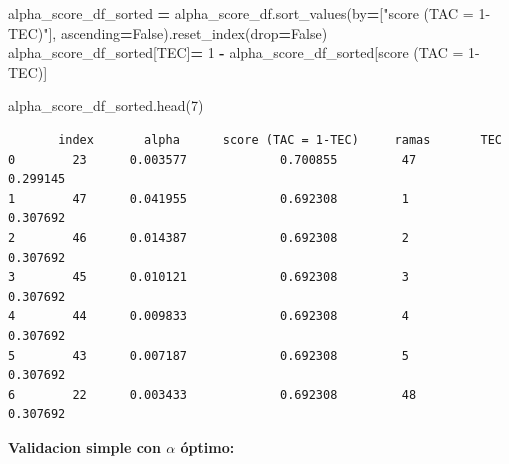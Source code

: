 \documentclass[
  11pt,
  a4paper,
]{article}
\newenvironment{Shaded}{\begin{snugshade}}{\end{snugshade}}
\newcommand{\DecValTok}[1]{\textcolor[rgb]{0.00,0.00,0.81}{#1}}
\newcommand{\NormalTok}[1]{#1}
\newcommand{\OperatorTok}[1]{\textcolor[rgb]{0.81,0.36,0.00}{\textbf{#1}}}
\newcommand{\StringTok}[1]{\textcolor[rgb]{0.31,0.60,0.02}{#1}}
\newcommand{\VariableTok}[1]{\textcolor[rgb]{0.00,0.00,0.00}{#1}}
\begin{document}
\begin{Shaded}
\begin{Highlighting}[]
\NormalTok{alpha\_score\_df\_sorted }\OperatorTok{=}\NormalTok{ alpha\_score\_df.sort\_values(by}\OperatorTok{=}\NormalTok{[}\StringTok{"score (TAC = 1{-}TEC)"}\NormalTok{], ascending}\OperatorTok{=}\VariableTok{False}\NormalTok{).reset\_index(drop}\OperatorTok{=}\VariableTok{False}\NormalTok{)}
\NormalTok{alpha\_score\_df\_sorted[}\StringTok{\textquotesingle{}TEC\textquotesingle{}}\NormalTok{]}\OperatorTok{=} \DecValTok{1} \OperatorTok{{-}}\NormalTok{ alpha\_score\_df\_sorted[}\StringTok{\textquotesingle{}score (TAC = 1{-}TEC)\textquotesingle{}}\NormalTok{]}
\end{Highlighting}
\end{Shaded}

\begin{Shaded}
\begin{Highlighting}[]
\NormalTok{alpha\_score\_df\_sorted.head(}\DecValTok{7}\NormalTok{)}
\end{Highlighting}
\end{Shaded}

\begin{verbatim}
       index       alpha      score (TAC = 1-TEC)     ramas       TEC
0        23      0.003577             0.700855         47       0.299145
1        47      0.041955             0.692308         1        0.307692
2        46      0.014387             0.692308         2        0.307692
3        45      0.010121             0.692308         3        0.307692
4        44      0.009833             0.692308         4        0.307692
5        43      0.007187             0.692308         5        0.307692
6        22      0.003433             0.692308         48       0.307692
\end{verbatim}

\vspace{0.5cm}

\textbf{Validacion simple con \(\alpha\) óptimo:}
\end{document}
